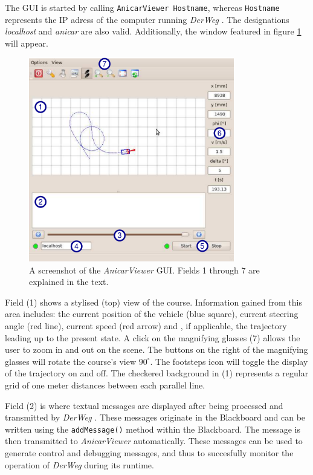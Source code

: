 \documentclass[a4paper, 11pt]{article}
\newcommand{\code}[1]{\texttt{#1}}
\newcommand{\DerWeg}{\textit{DerWeg }} %
\newcommand{\AnicarViewer}{\textit{AnicarViewer }} %
\begin{document}
The GUI is started by calling \texttt{AnicarViewer Hostname}, whereas \texttt{Hostname} represents the IP adress of the computer running \DerWeg. The designations \textit{localhost} and \textit{anicar} are also valid. Additionally, the window featured in figure \ref{fig:AnicarViewerSnapshot} will appear. 

\begin{figure}
\centering
\includegraphics[width=0.8\textwidth]{anicarviewer} 
\caption{A screenshot of the \textit{AnicarViewer} GUI. Fields 1 through 7 are explained in the text.}
\label{fig:AnicarViewerSnapshot}
\end{figure}

Field (1) shows a stylised (top) view of the course. Information gained from this area includes: the current position of the vehicle (blue square), current steering angle (red line), current speed (red arrow) and , if applicable, the trajectory leading up to the present state. A click on the magnifying glasses (7) allows the user to zoom in and out on the scene. The buttons on the right of the magnifying glasses will rotate the course's view $90^\circ$. The footsteps icon will toggle the display of the trajectory on and off. The checkered background in (1) represents a regular grid of one meter distances between each parallel line. 

Field (2) is where textual messages are displayed after being processed and transmitted by \DerWeg. These messages originate in the Blackboard and can be written using the \code{addMessage()} method within the Blackboard. The message is then transmitted to \AnicarViewer automatically. These messages can be used to generate control and debugging messages, and thus to succesfully monitor the operation of \DerWeg during its runtime. 
\end{document}
